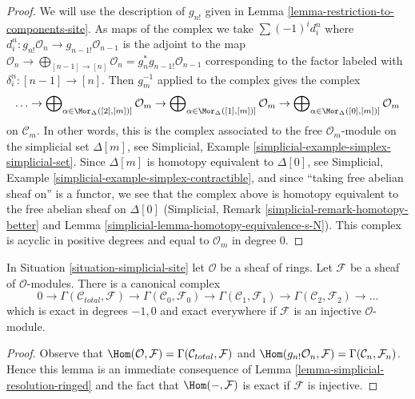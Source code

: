 \begin{proof}
We will use the description of $g_{n!}$ given in
Lemma \ref{lemma-restriction-to-components-site}.
As maps of the complex we take $\sum (-1)^i d^n_i$ where
$d^n_i : g_{n!}\mathcal{O}_n \to g_{n - 1!}\mathcal{O}_{n - 1}$
is the adjoint to the map
$\mathcal{O}_n \to \bigoplus_{[n - 1] \to [n]} \mathcal{O}_n =
g_n^*g_{n - 1!}\mathcal{O}_{n - 1}$
corresponding to the factor labeled with $\delta^n_i : [n - 1] \to [n]$.
Then $g_m^{-1}$ applied to the complex gives the complex
$$
\ldots \to
\bigoplus\nolimits_{\alpha \in \Mor_\Delta([2], [m])]} \mathcal{O}_m \to
\bigoplus\nolimits_{\alpha \in \Mor_\Delta([1], [m])]} \mathcal{O}_m \to
\bigoplus\nolimits_{\alpha \in \Mor_\Delta([0], [m])]} \mathcal{O}_m
$$
on $\mathcal{C}_m$.
In other words, this is the complex associated to the
free $\mathcal{O}_m$-module on the simplicial set $\Delta[m]$, see
Simplicial, Example \ref{simplicial-example-simplex-simplicial-set}.
Since $\Delta[m]$ is homotopy equivalent to $\Delta[0]$, see
Simplicial, Example \ref{simplicial-example-simplex-contractible},
and since ``taking free abelian sheaf on'' is a functor,
we see that the complex above is homotopy equivalent to
the free abelian sheaf on $\Delta[0]$
(Simplicial, Remark \ref{simplicial-remark-homotopy-better} and
Lemma \ref{simplicial-lemma-homotopy-equivalence-s-N}).
This complex is acyclic in positive degrees
and equal to $\mathcal{O}_m$ in degree $0$.
\end{proof}

\begin{lemma}
\label{lemma-cech-complex-modules}
In Situation \ref{situation-simplicial-site} let $\mathcal{O}$
be a sheaf of rings. Let $\mathcal{F}$ be a
sheaf of $\mathcal{O}$-modules. There is a canonical complex
$$
0 \to \Gamma(\mathcal{C}_{total}, \mathcal{F}) \to
\Gamma(\mathcal{C}_0, \mathcal{F}_0) \to
\Gamma(\mathcal{C}_1, \mathcal{F}_1) \to
\Gamma(\mathcal{C}_2, \mathcal{F}_2) \to \ldots
$$
which is exact in degrees $-1, 0$ and exact everywhere
if $\mathcal{F}$ is an injective $\mathcal{O}$-module.
\end{lemma}

\begin{proof}
Observe that
$\Hom(\mathcal{O}, \mathcal{F}) = \Gamma(\mathcal{C}_{total}, \mathcal{F})$
and
$\Hom(g_{n!}\mathcal{O}_n, \mathcal{F}) = \Gamma(\mathcal{C}_n, \mathcal{F}_n)$.
Hence this lemma is an immediate consequence of
Lemma \ref{lemma-simplicial-resolution-ringed}
and the fact that $\Hom(-, \mathcal{F})$ is exact if
$\mathcal{F}$ is injective.
\end{proof}

